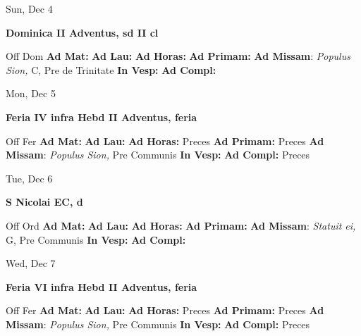 \documentclass[10pt]{article}
\begin{document}
\begin{minipage}{3.5in}
\vspace{2em}\begin{center}
Sun, Dec 4
\end{center}\textbf{ \large Dominica II Adventus, \textnormal{\normalsize sd II cl}}
\begin{justify}
Off Dom
\textbf{Ad Mat: }
\textbf{Ad Lau: }
\textbf{Ad Horas: }
\textbf{Ad Primam: }
\textbf{Ad Missam}: \textit{Populus Sion,} C, Pre de Trinitate
\textbf{In Vesp: }
\textbf{Ad Compl: }\end{justify}
\end{minipage}



\begin{minipage}{3.5in}
\vspace{2em}\begin{center}
Mon, Dec 5
\end{center}\textbf{ \large Feria IV infra Hebd II Adventus, \textnormal{\normalsize feria}}
\begin{justify}
Off Fer
\textbf{Ad Mat: }
\textbf{Ad Lau: }
\textbf{Ad Horas: }Preces
\textbf{Ad Primam: }Preces
\textbf{Ad Missam}: \textit{Populus Sion,} Pre Communis
\textbf{In Vesp: }
\textbf{Ad Compl: }Preces\end{justify}
\end{minipage}



\begin{minipage}{3.5in}
\vspace{2em}\begin{center}
Tue, Dec 6
\end{center}\textbf{ \large S Nicolai EC, \textnormal{\normalsize d}}
\begin{justify}
Off Ord
\textbf{Ad Mat: }
\textbf{Ad Lau: }
\textbf{Ad Horas: }
\textbf{Ad Primam: }
\textbf{Ad Missam}: \textit{Statuit ei,} G, Pre Communis
\textbf{In Vesp: }
\textbf{Ad Compl: }\end{justify}
\end{minipage}



\begin{minipage}{3.5in}
\vspace{2em}\begin{center}
Wed, Dec 7
\end{center}\textbf{ \large Feria VI infra Hebd II Adventus, \textnormal{\normalsize feria}}
\begin{justify}
Off Fer
\textbf{Ad Mat: }
\textbf{Ad Lau: }
\textbf{Ad Horas: }Preces
\textbf{Ad Primam: }Preces
\textbf{Ad Missam}: \textit{Populus Sion,} Pre Communis
\textbf{In Vesp: }
\textbf{Ad Compl: }Preces\end{justify}
\end{minipage}
\end{document}
